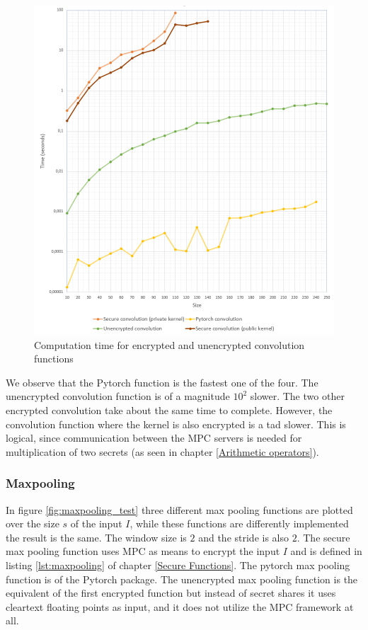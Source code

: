 \begin{figure}[H]
  \includegraphics[scale=0.6]{fig/convolution_test.png}
  \centering
  \caption{Computation time for encrypted and unencrypted convolution functions}
  \label{fig:convolution_test}
\end{figure}

We observe that the Pytorch function is the fastest one of the four. The unencrypted convolution function is of a magnitude $10^2$ slower. The two other encrypted convolution take about the same time to complete. However, the convolution function where the kernel is also encrypted is a tad slower. This is logical, since communication between the MPC servers is needed for multiplication of two secrets (as seen in chapter \ref{Arithmetic operators}).

\subsubsection{Maxpooling}
In figure \ref{fig:maxpooling_test} three different max pooling functions are plotted over the size $s$ of the input $I$, while these functions are differently implemented the result is the same. The window size is $2$ and the stride is also $2$. The secure max pooling function uses MPC as means to encrypt the input $I$ and is defined in listing \ref{lst:maxpooling} of chapter \ref{Secure Functions}. The pytorch max pooling function is  of the Pytorch package. The unencrypted max pooling function is the equivalent of the first encrypted function but instead of secret shares it uses cleartext floating points as input, and it does not utilize the MPC framework at all.

